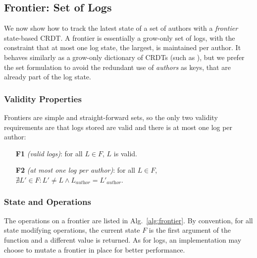 \documentclass[9pt, oneside]{article}   	%
\begin{document}
\subsection{Frontier: Set of Logs}
\label{sec:design:frontier}

We now show how to track the latest state of a set of authors with a \textit{frontier} state-based CRDT. A frontier is essentially a grow-only set of logs, with the constraint that at most one log state, the largest, is maintained per author. It behaves similarly as a grow-only dictionary of CRDTs (such as \cite{lavoie2023inftypset, lavoie2023gocledger}), but we prefer the set formulation to avoid the redundant use of \textit{authors} as keys, that are already part of the log state.

\subsubsection{Validity Properties}

Frontiers are simple and straight-forward sets, so the only two validity requirements are that logs stored are valid and there is at most one log per author:
\begin{tcolorbox}
\begin{enumerate}
	\item[\textbf{F1}] \textit{(valid logs)}: for all $L \in F$, $L$ is valid.
	\item[\textbf{F2}] \textit{(at most one log per author)}: for all $L \in F$, $\nexists L' \in F : L' \neq L \wedge L_\textit{author} = L'_\textit{author}$.
\end{enumerate}
\end{tcolorbox}


\subsubsection{State and Operations}

The operations on a frontier are listed in Alg.~\ref{alg:frontier}. By convention, for all state modifying operations, the current state $F$ is the first argument of the function and a different value is returned. As for logs, an implementation may choose to mutate a frontier in place for better performance.
\end{document}
